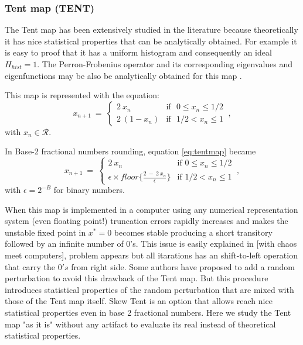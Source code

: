 \subsubsection{Tent map (TENT)} \label{sssec:tent}

The Tent map has been extensively studied in the literature because theoretically it has nice  statistical properties that can be analytically obtained. For example it is easy to proof that it has a uniform histogram and consequently an ideal $H_{hist}=1$. The Perron-Frobenius operator and its corresponding eigenvalues and eigenfunctions may be also be analytically obtained for this map \cite{tent}. 

This map is represented with the equation:
\begin{equation}\label{eq:tentmap}
x_{n+1}~=~ \left\{ \begin{array}{ll}
2~{x_n} & \textrm{if ~$0\leq x_n\leq 1/2$}\\
2~(1-{x_n}) & \textrm{if ~$1/2<x_n\leq 1$} 
\end{array} \right.  \ ,
\end{equation}
with $x_n\in\mathcal{R}$.

In Base-2 fractional numbers rounding, equation \ref{eq:tentmap} became
\begin{equation}\label{eq:tentdecbin}
x_{n+1}~=~ \left\{ \begin{array}{ll}
2~{x_n} & \textrm{if $0\leq x_n\leq 1/2$}\\
\epsilon \times floor\{\frac{2~-~2~x_n}{\epsilon}\} & \textrm{if $1/2<x_n\leq 1$} 
\end{array} \right.  \ ,
\end{equation}
with $\epsilon=2^{-B}$ for binary numbers.

When this map is implemented in a computer using any numerical representation system (even floating point!) truncation errors rapidly increases and makes the unstable fixed point in $x^*=0$ becomes stable producing a short transitory followed by an infinite number of  $0$'s\cite{Jessa1993,Callegari1997}.
This issue is easily explained in [with chaos meet computers], problem appears but all itarations has an shift-to-left operation that carry the $0's$ from right side.
Some authors \cite{buscar} have proposed to add a random perturbation to avoid this drawback of the Tent map. But this procedure introduces statistical properties of the random perturbation that are mixed with those of the Tent map itself.
Skew Tent is an option that allows reach nice statistical properties even in base 2 fractional numbers.
Here we study the Tent map "as it is" without any artifact to evaluate its real instead of theoretical statistical properties. 

